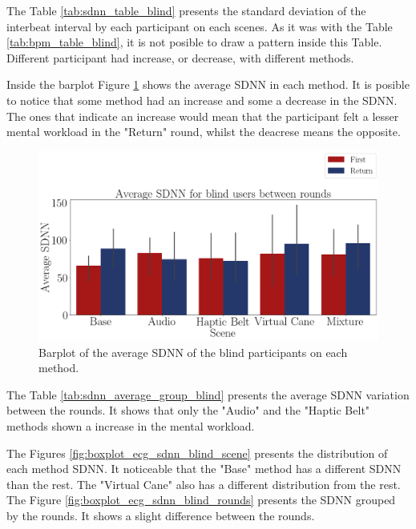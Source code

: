 The Table \ref{tab:sdnn_table_blind} presents the standard deviation of the interbeat interval by each participant on each scenes. As it was with the Table \ref{tab:bpm_table_blind}, it is not posible to draw a pattern inside this Table. Different participant had increase, or decrease, with different methods.



Inside the barplot Figure \ref{fig:barplot_ecg_sdnn_5_scene_blind} shows the average SDNN in each method. It is posible to notice that some method had an increase and some a decrease in the SDNN. The ones that indicate an increase would mean that the participant felt a lesser mental workload in the "Return" round, whilst the deacrese means the opposite.

\begin{figure}[!htb]
    \centering
    \includegraphics[width = 0.8\linewidth]{Resultados/ECG/Figuras/png/barplot_ecg_sdnn_5_scene_blind.png}
    \caption{Barplot of the average SDNN of the blind participants on each method.}
    \label{fig:barplot_ecg_sdnn_5_scene_blind}
\end{figure}

The Table \ref{tab:sdnn_average_group_blind} presents the average SDNN variation between the rounds. It shows that only the "Audio" and the "Haptic Belt" methods shown a increase in the mental workload.



The Figures \ref{fig:boxplot_ecg_sdnn_blind_scene} presents the distribution of each method SDNN. It noticeable that the "Base" method has a different SDNN than the rest. The "Virtual Cane" also has a different distribution from the rest. The Figure \ref{fig:boxplot_ecg_sdnn_blind_rounds} presents the SDNN grouped by the rounds. It shows a slight difference between the rounds.


